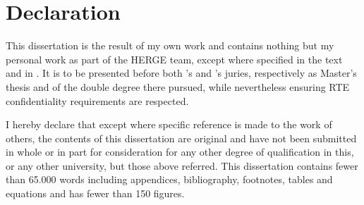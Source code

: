 

\chapter{Declaration} 


This dissertation is the result of my own work and contains nothing but my personal work  as part of the HERGE team, except where specified in the text and in . It is to be presented before both 's and 's juries, respectively as Master's thesis and  of the double degree there pursued, while nevertheless ensuring RTE confidentiality requirements are respected.

I hereby declare that except where specific reference is made to the work of others, the contents of this dissertation are original and have not been submitted in whole or in part for consideration for any other degree of qualification in this, or any other university, but those above referred.
This dissertation contains fewer than 65.000 words including appendices, bibliography, footnotes, tables and equations and has fewer than 150 figures.

 \begin{flushright}
 
\Author
\\
\Date
\end{flushright}
